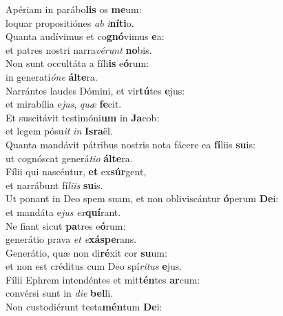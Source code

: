 \evenverse Apériam in parábo\textbf{lis} os \textbf{me}um:~\*\\
\evenverse loquar propositiónes \textit{ab} \textit{i}\textbf{ní}\textbf{ti}o.\\
\oddverse Quanta audívimus et co\textbf{gnó}vimus \textbf{e}a:~\*\\
\oddverse et patres nostri narra\textit{vé}\textit{runt} \textbf{no}bis.\\
\evenverse Non sunt occultáta a fíli\textbf{is} e\textbf{ó}rum:~\*\\
\evenverse in generati\textit{ó}\textit{ne} \textbf{ál}\textbf{te}ra.\\
\oddverse Narrántes laudes Dómini, et vir\textbf{tú}tes \textbf{e}jus:~\*\\
\oddverse et mirabília e\textit{jus}, \textit{quæ} \textbf{fe}cit.\\
\evenverse Et suscitávit testimóni\textbf{um} in \textbf{Ja}cob:~\*\\
\evenverse et legem pósu\textit{it} \textit{in} \textbf{Is}\textbf{ra}ël.\\
\oddverse Quanta mandávit pátribus nostris nota fácere ea \textbf{fí}liis \textbf{su}is:~\*\\
\oddverse ut cognóscat generá\textit{ti}\textit{o} \textbf{ál}\textbf{te}ra.\\
\evenverse Fílii qui nascéntur, \textbf{et} ex\textbf{súr}gent,~\*\\
\evenverse et narrábunt fí\textit{li}\textit{is} \textbf{su}is.\\
\oddverse Ut ponant in Deo spem suam, et non obliviscántur \textbf{ó}perum \textbf{De}i:~\*\\
\oddverse et mandáta e\textit{jus} \textit{ex}\textbf{quí}rant.\\
\evenverse Ne fiant sicut \textbf{pa}tres e\textbf{ó}rum:~\*\\
\evenverse generátio prava \textit{et} \textit{e}\textbf{xá}\textbf{spe}rans.\\
\oddverse Generátio, quæ non di\textbf{ré}xit cor \textbf{su}um:~\*\\
\oddverse et non est créditus cum Deo spí\textit{ri}\textit{tus} \textbf{e}jus.\\
\evenverse Fílii Ephrem intendéntes et mit\textbf{tén}tes \textbf{ar}cum:~\*\\
\evenverse convérsi sunt in \textit{di}\textit{e} \textbf{bel}li.\\
\oddverse Non custodiérunt testa\textbf{mén}tum \textbf{De}i:~\*\\

